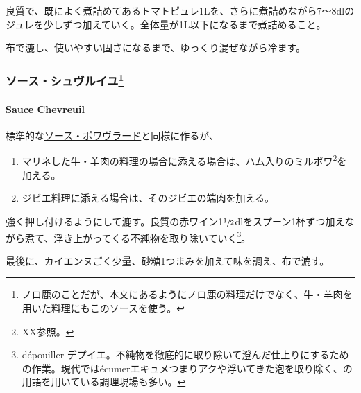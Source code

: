 \documentclass[twoside,12Q,b5j]{escoffierltjsbook}
\newenvironment{recette}{\begin{small}\begin{spacing}{1}\begin{multicols}{2}}{\end{multicols}\end{spacing}\end{small}}
\begin{document}
\begin{recette}
良質で、既によく煮詰めてあるトマトピュレ1Lを、さらに煮詰めながら7〜8dlのジュレを少しずつ加えていく。全体量が1L以下になるまで煮詰めること。

布で漉し、使いやすい固さになるまで、ゆっくり混ぜながら冷ます。

\vspace*{1.7\zw}

\subsubsection[ソース・シュヴルイユ]{\texorpdfstring{ソース・シュヴルイユ\footnote{ノロ鹿のことだが、本文にあるようにノロ鹿の料理だけでなく、牛・羊肉を用いた料理にもこのソースを使う。}}{ソース・シュヴルイユ}}\label{ux30bdux30fcux30b9ux30b7ux30e5ux30f4ux30ebux30a4ux30e618}

\paragraph{Sauce Chevreuil}\label{sauce-chevreuil}


標準的な\protect\hyperlink{sauce-poivrade}{ソース・ポワヴラード}と同様に作るが、

\begin{enumerate}
\def\labelenumi{\arabic{enumi}.}
\item
  マリネした牛・羊肉の料理の場合に添える場合は、ハム入りの\protect\hyperlink{mirepoix}{ミルポワ}\footnote{XX参照。}を加える。
\item
  ジビエ料理に添える場合は、そのジビエの端肉を加える。
\end{enumerate}

強く押し付けるようにして漉す。良質の赤ワイン1\(\sfrac{1}{2}\)dlをスプーン1杯ずつ加えながら煮て、浮き上がってくる不純物を取り除いていく\footnote{dépouiller
  デプイエ。不純物を徹底的に取り除いて澄んだ仕上りにするための作業。現代ではécumerエキュメつまりアクや浮いてきた泡を取り除く、の用語を用いている調理現場も多い。}。

最後に、カイエンヌごく少量、砂糖1つまみを加えて味を調え、布で漉す。

\end{recette}
{\printindex}
\end{document}
